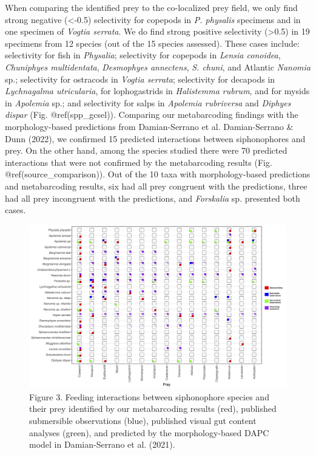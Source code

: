 \documentclass[12pt,]{article}
\begin{document}
When comparing the identified prey to the co-localized prey field, we only find strong negative (\textless{}-0.5) selectivity for copepods in \emph{P. physalis} specimens and in one specimen of \emph{Vogtia serrata}. We do find strong positive selectivity (\textgreater{}0.5) in 19 specimens from 12 species (out of the 15 species assessed). These cases include: selectivity for fish in \emph{Physalia}; selectivity for copepods in \emph{Lensia conoidea}, \emph{Chuniphyes multidentata}, \emph{Desmophyes annectens}, \emph{S. chuni}, and Atlantic \emph{Nanomia} sp.; selectivity for ostracods in \emph{Vogtia serrata}; selectivity for decapods in \emph{Lychnagalma utricularia}, for lophogastrids in \emph{Halistemma rubrum}, and for mysids in \emph{Apolemia} sp.; and selectivity for salps in \emph{Apolemia rubriversa} and \emph{Diphyes dispar} (Fig. @ref(spp\_gcsel)). Comparing our metabarcoding findings with the morphology-based predictions from Damian-Serrano et al. Damian-Serrano \& Dunn (2022), we confirmed 15 predicted interactions between siphonophores and prey. On the other hand, among the species studied there were 70 predicted interactions that were not confirmed by the metabarcoding results (Fig. @ref(source\_comparison)). Out of the 10 taxa with morphology-based predictions and metabarcoding results, six had all prey congruent with the predictions, three had all prey incongruent with the predictions, and \emph{Forskalia} sp. presented both cases.

\begin{figure}
\centering
\includegraphics{Figures/Source_comparison.png}
\caption{\label{source_comparison} Figure 3. Feeding interactions between siphonophore species and their prey identified by our metabarcoding results (red), published submersible observations (blue), published visual gut content analyses (green), and predicted by the morphology-based DAPC model in Damian-Serrano et al. (2021).}
\end{figure}
\end{document}
